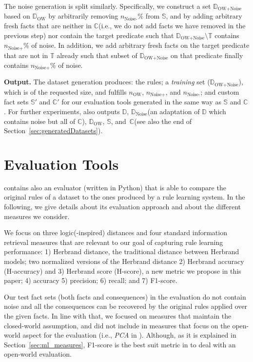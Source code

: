 \documentclass[letterpaper]{article} \usepackage{aaai20}  \usepackage{times}  \usepackage{helvet} \usepackage{courier}  \usepackage[hyphens]{url}  \usepackage{graphicx} \urlstyle{rm} \def\UrlFont{\rm}  \usepackage{graphicx}  \frenchspacing  \setlength{\pdfpagewidth}{8.5in}  \setlength{\pdfpageheight}{11in}  \usepackage{amsthm}
\theoremstyle{definition}
\newcommand{\tool}{\text{RuDaS}\xspace}
\newcommand{\nowa}{\ensuremath{n_{\text{OW}}}\xspace}
\newcommand{\nnoiseadd}{\ensuremath{n_{\text{Noise+}}}\xspace}
\newcommand{\nnoisemiss}{\ensuremath{n_{\text{Noise-}}}\xspace}
\newcommand{\db}{\ensuremath{\mathbb{D}}\xspace}\newcommand{\dbowa}{\ensuremath{\db_{\text{OW}}}\xspace}
\newcommand{\dbowan}{\ensuremath{\db_{\text{OW+Noise}}}\xspace}
\newcommand{\dbn}{\ensuremath{\db_{\text{Noise}}}\xspace}
\newcommand{\sfacts}{\ensuremath{\mathbb{S}}\xspace}
\newcommand{\cfacts}{\ensuremath{\mathbb{C}}\xspace}
\newcommand{\tfacts}{\ensuremath{\mathbb{T}}\xspace}
\begin{document}
The noise generation is split similarly. Specifically, we construct a set \dbowan based on \dbowa by arbitrarily removing $\nnoisemiss\%$ from \sfacts, and by adding arbitrary fresh facts that are neither in \cfacts (i.e., we do not add facts we have removed in the previous step) nor contain the target predicate
such that $\dbowan\setminus\tfacts$ contains $\nnoiseadd\%$ of noise.
In addition, we add arbitrary fresh facts on the target predicate that are not in \tfacts already such that subset of \dbowan on that predicate finally contains $\nnoiseadd\%$ of noise.

\textbf{Output.}
The dataset generation produces:
the rules; a \emph{training} set (\dbowan), which is of the requested size, and fulfills \nowa, \nnoiseadd, and \nnoisemiss; and custom fact sets $\sfacts'$ and $\cfacts'$ for our evaluation tools generated in the same way as \sfacts and \cfacts. 
For further experiments, \tool 
also outputs \db, \dbn (an adaptation of \db which contains noise but all of \cfacts), \dbowa, \sfacts, and~\cfacts (see also the end of Section~\ref{sec:generatedDatasets}).

\section{Evaluation Tools}\label{sec:evaluation}

\tool contains also an evaluator (written in Python) that is able to compare the original rules of a dataset to the ones produced by a rule learning system. 
In the following, we give details about its evaluation approach and about the different measures we consider.

We focus on three logic(-inspired) distances and four standard information retrieval measures that are relevant to our goal of capturing rule learning performance: 
1) Herbrand distance, the traditional {distance between Herbrand models}; two normalized versions of the Herbrand distance 2) Herbrand accuracy (H-accuracy) and 3) Herbrand score (H-score), a new metric we propose in this paper; 4) accuracy 5) precision;  6) recall; and 7) F1-score. 




Our test fact sets (both facts and consequences) in the evaluation do not contain noise and all the consequences can be recovered by the original rules applied over the given facts. In line with that, we focused on measures that maintain the closed-world assumption, and did not include in \tool measures that focus on the open-world aspect for the evaluation (i.e., {\it PCA} in \cite{Galarraga+-VLDBJ15:amiep}). 
Although, as it is explained in Section~\ref{sec:ml_measures}, F1-score is the best suit metric in \tool to deal with an open-world evaluation. 
\end{document}
